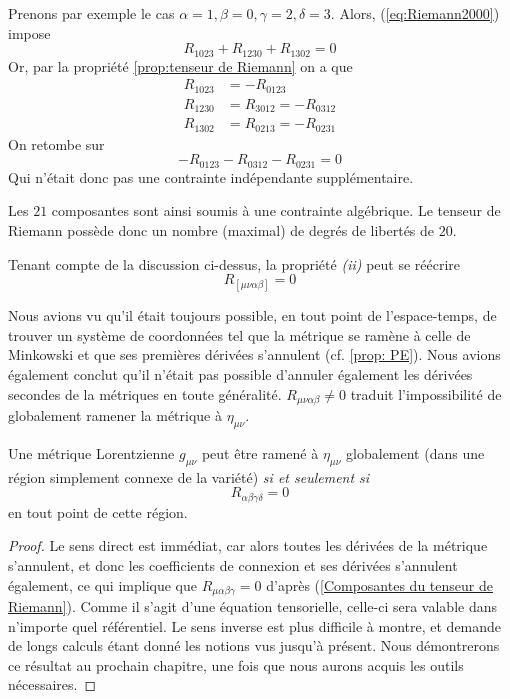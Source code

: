 \begin{exmp}
    Prenons par exemple le cas $\alpha = 1, \beta =0, \gamma = 2, \delta = 3$. Alors, (\ref{eq:Riemann2000}) impose 
    \begin{equation}
        R_{1023} + R_{1230} + R_{1302} = 0
    \end{equation}
    Or, par la propriété \ref{prop:tenseur de Riemann} on a que
    \begin{align*}
        R_{1023} &= - R_{0123} \\
        R_{1230} &= R_{3012} = - R_{0312}\\
        R_{1302} &= R_{0213} = -R_{0231} 
    \end{align*}
    On retombe sur
    \begin{equation}
        - R_{0123} - R_{0312}-R_{0231}=0
    \end{equation}
    Qui n'était donc pas une contrainte indépendante supplémentaire.
\end{exmp}
Les $21$ composantes sont ainsi soumis à une contrainte algébrique. Le tenseur de Riemann possède donc un nombre (maximal) de degrés de libertés de $20$. 
\begin{rmk}
    Tenant compte de la discussion ci-dessus, la propriété \emph{(ii)} peut se réécrire 
    \begin{equation}
        R_{[\mu\nu\alpha\beta]} = 0
    \end{equation}
\end{rmk}
Nous avions vu qu'il était toujours possible, en tout point de l'espace-temps, de trouver un système de coordonnées tel que la métrique se ramène à celle de Minkowski et que ses premières dérivées s'annulent (cf. \ref{prop: PE}). Nous avions également conclut qu'il n'était pas possible d'annuler également les dérivées secondes de la métriques en toute généralité. $R_{\mu\nu\alpha\beta} \neq 0$ traduit l'impossibilité de globalement ramener la métrique à $\eta_{\mu\nu}$.
\begin{theoremframe}
    \begin{theorem}
    \label{thm:métrique globalement plate}
        Une métrique Lorentzienne $g_{\mu \nu}$ peut être ramené à $\eta_{\mu \nu}$ globalement (dans une région simplement connexe de la variété) \emph{si et seulement si}
        \begin{equation}
            R_{\alpha \beta \gamma \delta} =0
        \end{equation}
        en tout point de cette région.
    \end{theorem}
\end{theoremframe}
\begin{proof}
    Le sens direct est immédiat, car alors toutes les dérivées de la métrique s'annulent, et donc les coefficients de connexion et ses dérivées s'annulent également, ce qui implique que $R_{\mu \alpha \beta \gamma} = 0$ d'après (\ref{Composantes du tenseur de Riemann}). Comme il s'agit d'une équation tensorielle, celle-ci sera valable dans n'importe quel référentiel. Le sens inverse est plus difficile à montre, et demande de longs calculs étant donné les notions vus jusqu'à présent. Nous démontrerons ce résultat au prochain chapitre, une fois que nous aurons acquis les outils nécessaires.
\end{proof}

